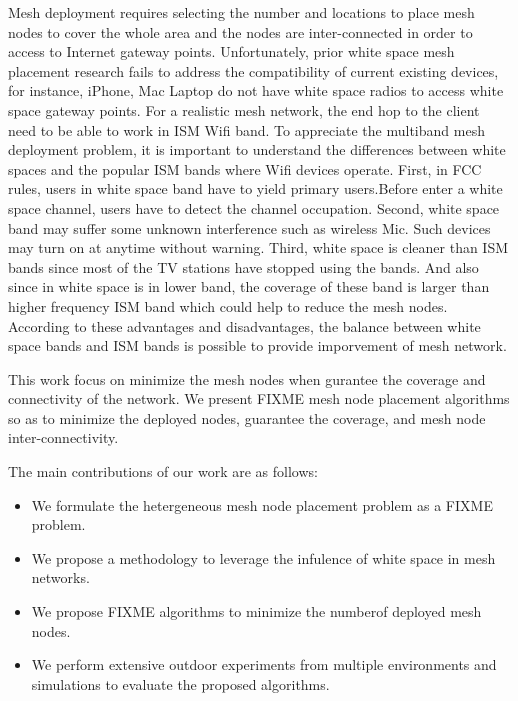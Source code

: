 Mesh deployment requires selecting the number and locations to place mesh nodes to cover the whole area and the nodes are inter-connected in order to access to Internet gateway points.
Unfortunately, prior white space mesh placement research fails to address the compatibility of current existing devices, for instance, iPhone, Mac Laptop do not have white space radios to access white space gateway points. For a realistic mesh network, the end hop to the client need to be able to work in ISM Wifi band. 
To appreciate the multiband mesh deployment problem, it is important to understand the differences between white spaces and the popular ISM bands where Wifi devices operate. First, in FCC rules, users in white space band have to yield primary users.Before enter a white space channel, users have to detect the channel occupation. Second, white space band may suffer some unknown interference such as wireless Mic. Such devices may turn on at anytime without warning. Third, white space is cleaner than ISM bands since most of the TV stations have stopped using the bands. And also since in white space is in lower band, the coverage of these band is larger than higher frequency ISM band which could help to reduce the mesh nodes. According to these advantages and disadvantages, the balance between white space bands and ISM bands is possible to provide imporvement of mesh network. 


This work focus on minimize the mesh nodes when gurantee the coverage and connectivity of the network.
We present FIXME mesh node placement algorithms so as to minimize the deployed nodes, guarantee the coverage, and mesh node inter-connectivity.


% 

% 
The main contributions of our work are as follows:
\begin{itemize}
\item We formulate the hetergeneous mesh node placement problem as a FIXME problem.  

\item We propose a methodology to leverage the infulence of white space in mesh networks.

\item We propose FIXME algorithms to minimize the numberof deployed mesh nodes.

\item We perform extensive outdoor experiments from multiple environments and simulations to evaluate the proposed algorithms.


\end{itemize}





